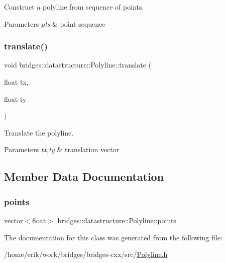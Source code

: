 Construct a polyline from sequence of points. 


\begin{DoxyParams}{Parameters}
{\em pts} & point sequence \\
\hline
\end{DoxyParams}
\mbox{\label{classbridges_1_1datastructure_1_1_polyline_a0b651b1c383b228f8d473232e64e4bda}} 
\subsubsection{\texorpdfstring{translate()}{translate()}}
{\footnotesize\ttfamily void bridges\+::datastructure\+::\+Polyline\+::translate (\begin{DoxyParamCaption}\item[{float}]{tx,  }\item[{float}]{ty }\end{DoxyParamCaption})\hspace{0.3cm}{\ttfamily [inline]}}



Translate the polyline. 


\begin{DoxyParams}{Parameters}
{\em tx,ty} & translation vector \\
\hline
\end{DoxyParams}


\subsection{Member Data Documentation}
\mbox{\label{classbridges_1_1datastructure_1_1_polyline_a0df21b6c3cc82930a93a495de5affda7}} 
\subsubsection{\texorpdfstring{points}{points}}
{\footnotesize\ttfamily vector$<$float$>$ bridges\+::datastructure\+::\+Polyline\+::points\hspace{0.3cm}{\ttfamily [protected]}}



The documentation for this class was generated from the following file\+:\begin{DoxyCompactItemize}
\item 
/home/erik/work/bridges/bridges-\/cxx/src/\hyperlink{_polyline_8h}{Polyline.\+h}\end{DoxyCompactItemize}
